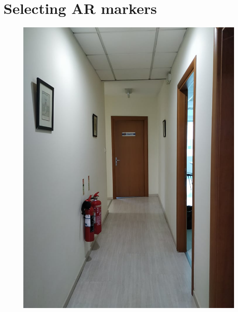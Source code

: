 \documentclass{aifyp}
\begin{document}
\begin{appendices}
\begin{figure}[H]
    \label{fig:SystemArchitectureDesign}
\end{figure}
\section{Selecting AR markers}
    \begin{figure}[H]
    \centering
        \begin{minipage}{.5\textwidth}
          \centering
          \includegraphics[scale=0.2]{Images/Chapter5/DatahandlingCorr.jpg}
          \label{fig:test1}
        \end{minipage}%
        \begin{minipage}{.5\textwidth}
          \centering

\end{minipage}
\end{figure}
\end{appendices}
\end{document}
